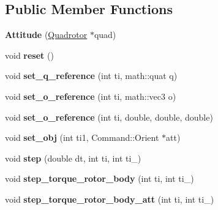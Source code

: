 \subsection*{\-Public \-Member \-Functions}
\begin{DoxyCompactItemize}
\item 
\hypertarget{classAttitude_a3d8702ddb8ebe640b4dae5d2a13415c7}{{\bfseries \-Attitude} (\hyperlink{classQuadrotor}{\-Quadrotor} $\ast$quad)}\label{classAttitude_a3d8702ddb8ebe640b4dae5d2a13415c7}

\item 
\hypertarget{classAttitude_a7e04169ea1c1b522a529c2c175cf73e7}{void {\bfseries reset} ()}\label{classAttitude_a7e04169ea1c1b522a529c2c175cf73e7}

\item 
\hypertarget{classAttitude_a8b8e86dce3952d51a2b31bdb19922f20}{void {\bfseries set\-\_\-q\-\_\-reference} (int ti, math\-::quat q)}\label{classAttitude_a8b8e86dce3952d51a2b31bdb19922f20}

\item 
\hypertarget{classAttitude_adb83854056302fbda19b037da086f839}{void {\bfseries set\-\_\-o\-\_\-reference} (int ti, math\-::vec3 o)}\label{classAttitude_adb83854056302fbda19b037da086f839}

\item 
\hypertarget{classAttitude_a9bc858b7855f4f3ea2b405759c34e6ec}{void {\bfseries set\-\_\-o\-\_\-reference} (int ti, double, double, double)}\label{classAttitude_a9bc858b7855f4f3ea2b405759c34e6ec}

\item 
\hypertarget{classAttitude_ac718a7f20470355bb45d1c14ef266d95}{void {\bfseries set\-\_\-obj} (int ti1, \-Command\-::\-Orient $\ast$att)}\label{classAttitude_ac718a7f20470355bb45d1c14ef266d95}

\item 
\hypertarget{classAttitude_a9d2850ba4bc838cf06907a351004bf13}{void {\bfseries step} (double dt, int ti, int ti\-\_)}\label{classAttitude_a9d2850ba4bc838cf06907a351004bf13}

\item 
\hypertarget{classAttitude_ad611f128c6a7d4cbb0f52fad22dc7c98}{void {\bfseries step\-\_\-torque\-\_\-rotor\-\_\-body} (int ti, int ti\-\_)}\label{classAttitude_ad611f128c6a7d4cbb0f52fad22dc7c98}

\item 
\hypertarget{classAttitude_a96c6947c3d191036db56a103e1a01f4d}{void {\bfseries step\-\_\-torque\-\_\-rotor\-\_\-body\-\_\-att} (int ti, int ti\-\_)}\label{classAttitude_a96c6947c3d191036db56a103e1a01f4d}


\end{DoxyCompactItemize}
